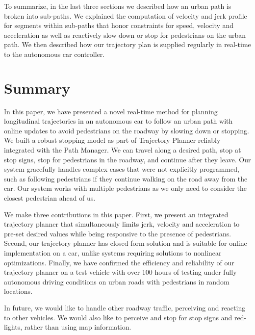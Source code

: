 \documentclass[letterpaper, 10 pt, conference]{ieeeconf}  %
\begin{document}

To summarize, in the last three sections we described how an urban path is broken into sub-paths. We 
explained the computation of velocity and jerk profile for segments within sub-paths that honor constraints
for speed, velocity and acceleration as well as reactively slow down or stop for pedestrians on
the urban path. We then described how our trajectory plan is supplied regularly in real-time to the
autonomous car controller.

\section{Summary} \label{sec:summary}


In this paper, we have presented a novel real-time method for planning longitudinal trajectories 
in an autonomous car to follow an urban path with online updates to avoid pedestrians on the roadway by slowing down or 
stopping.
We built a robust stopping model as part of Trajectory Planner reliably integrated with the Path Manager.
We can travel along a desired path, stop at stop signs, stop for pedestrians in the roadway, and continue after 
they leave. Our system gracefully handles complex cases that were not explicitly programmed, such as following 
pedestrians if they continue walking on the road away from the car. Our system works with multiple 
pedestrians as we only need to consider the closest pedestrian ahead of us. 

We make three contributions in this paper. First, we present an integrated trajectory planner that
simultaneously limits jerk, velocity and acceleration to pre-set desired values while being responsive 
to the presence of pedestrians.
Second, our trajectory planner has closed form solution and is suitable for online implementation
on a car, unlike systems requiring solutions to nonlinear optimizations. Finally, we have confirmed the
efficiency and reliability of our trajectory planner on a test vehicle with over 100 hours of testing
under fully autonomous driving conditions on urban roads with pedestrians in random locations. 

In future, we would like to handle other roadway traffic, perceiving and reacting to other vehicles. We would also like to perceive and stop for stop signs and red-lights,
rather than using map information.





\end{document}
